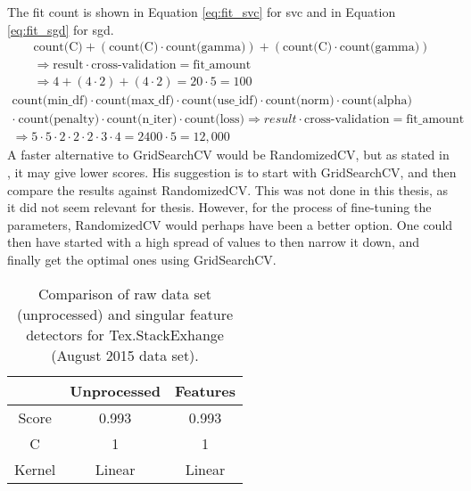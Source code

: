 The fit count is shown in Equation \ref{eq:fit_svc} for \gls{svc} and in Equation \ref{eq:fit_sgd} for \gls{sgd}.
\begin{equation}\label{eq:fit_svc}
\begin{split}
\text{count(C)} + (\text{count(C)} \cdot \text{count(gamma)}) + (\text{count(C)} \cdot \text{count(gamma)}) \\
\Longrightarrow  \text{result} \cdot \text{cross-validation} = \text{fit\_amount} \\
\Longrightarrow  4 + (4 \cdot 2) + (4 \cdot 2) = 20 \cdot 5 = 100 
\end{split}
\end{equation}
\begin{equation}\label{eq:fit_sgd}
\begin{split}
\text{count(min\_df)} \cdot \text{count(max\_df)} \cdot \text{count(use\_idf)} \cdot \text{count(norm)} \cdot \text{count(alpha)} \\ 
\cdot ~ \text{count(penalty)} \cdot \text{count(n\_iter)} \cdot \text{count(loss)} \Longrightarrow  result \cdot \text{cross-validation} = \text{fit\_amount} \\
\Longrightarrow  5 \cdot 5 \cdot 2 \cdot 2 \cdot 2 \cdot 3 \cdot 4 = 2400 \cdot 5 = 12,000
\end{split}
\end{equation}
A faster alternative to GridSearchCV would be RandomizedCV, but as stated in \cite{Markham2015a}, it may give lower scores. 
His suggestion is to start with GridSearchCV, and then compare the results against RandomizedCV.
This was not done in this thesis, as it did not seem relevant for thesis.
However, for the process of fine-tuning the parameters, RandomizedCV would perhaps have been a better option. 
One could then have started with a high spread of values to then narrow it down, and finally get the optimal ones using GridSearchCV.
 


\begin{table}[!h]%
	\centering
	\begin{tabular}{| c | c | c |}
		\hline
		~ 			& Unprocessed		& Features	\\ \hline
		Score 		& 0.993				& 0.993		\\ \hline
		C			& 1					& 1			\\ \hline
		Kernel		& Linear			& Linear	\\ \hline
	\end{tabular}
	\caption{Comparison of raw data set (unprocessed) and singular feature detectors for Tex.StackExhange (August 2015 data set).}
	\label{tab:singular_feature_detector_tex}
\end{table}


